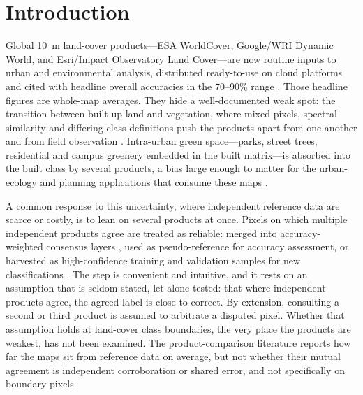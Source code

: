 \documentclass[remotesensing,article,submit,moreauthors]{Definitions/mdpi}
\begin{document}

\section{Introduction}\label{sec:intro}

Global 10~m land-cover products---ESA WorldCover, Google/WRI Dynamic World, and
Esri/Impact Observatory Land Cover---are now routine inputs to urban and
environmental analysis, distributed ready-to-use on cloud platforms and cited
with headline overall accuracies in the 70--90\% range
\citep{venter2022,xu2024}. Those headline figures are whole-map averages. They
hide a well-documented weak spot: the transition between built-up land and
vegetation, where mixed pixels, spectral similarity and differing class
definitions push the products apart from one another and from field observation
\citep{xu2024,yuan2026}. Intra-urban green space---parks, street trees,
residential and campus greenery embedded in the built matrix---is absorbed into
the built class by several products, a bias large enough to matter for the
urban-ecology and planning applications that consume these maps
\citep{yuan2026}.

A common response to this uncertainty, where independent reference data are
scarce or costly, is to lean on several products at once. Pixels on which
multiple independent products agree are treated as reliable: merged into
accuracy-weighted consensus layers \citep{tuanmu2014}, used as pseudo-reference
for accuracy assessment, or harvested as high-confidence training and
validation samples for new classifications \citep{zhangroy2017,wang2024a}. The
step is convenient and intuitive, and it rests on an assumption that is seldom
stated, let alone tested: that where independent products agree, the agreed
label is close to correct. By extension, consulting a second or third product
is assumed to arbitrate a disputed pixel. Whether that assumption holds at
land-cover class boundaries, the very place the products are weakest,
has not been examined. The product-comparison literature reports how far the
maps sit from reference data on average, but not whether their mutual agreement
is independent corroboration or shared error, and not specifically on boundary
pixels.
\end{document}
